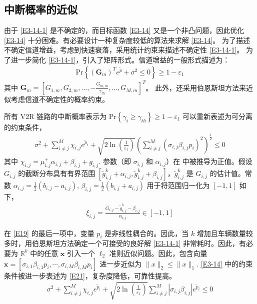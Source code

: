 \subsection{中断概率的近似}\label{section3-3-2}

由于 \eqref{E3-14-1} 是不确定的，而目标函数 \eqref{E3-14} 又是一个非凸问题，因此优化 \eqref{E3-14} 十分困难。有必要设计一种复杂度较低的算法来求解 \eqref{E3-14}。 为了描述不确定信道增益，考虑到快速衰落，采用统计约束来描述不确定性 \eqref{E3-14-1}。 为了进一步简化 \eqref{E3-14-1}，引入了矩阵形式。信道增益的一般形式描述为：
\begin{eqnarray}\label{E18}
\textrm{Pr}\left\{\left(\textbf{G}_m\right)^Te^{\widetilde{p}}+\sigma^2\le0\right\}\geq1-\varepsilon_1
\end{eqnarray}
其中 $\textbf{G}_m=\left[G_{1,m},G_{2,m},\ldots,-\frac{G_{m,m}}{\gamma_{th}},\ldots,G_{M,m}\right]^T$。
此外，还采用伯恩斯坦方法来近似考虑信道不确定性的概率约束。

所有 V2R 链路的中断概率表示为 $\textrm{Pr}\left\{\gamma_i\geq\gamma_{th}\right\}\geq1-\varepsilon_1$
可以重新表述为可分离的约束条件，
\begin{eqnarray}\label{E19}
\!\!\!\sigma^2+\!\sum_{i\neq j}^{M}{\chi_{i,j}e^{{\widetilde{p}}_i}}+\sqrt{2\ln\left(\frac{1}{\varepsilon_1}\right)}\left(\sum_{i\neq j}^{M}\left(\sigma_{i,j}\beta_{i,j}p_i\right)^2\right)^\frac{1}{2}\!\!\!\!\!\le0
\end{eqnarray}
其中 $\chi_{i,j}=\mu_{i,j}^+\alpha_{i,j}+\beta_{i,j}+g_{i,j}$. 参数（即 $\sigma_{i,j}$ 和 $\alpha_{i,j}$）在 \cite{CCO} 中被推导为正值。假设 $G_{i,j}$ 的截断分布具有有界范围 $\left[{\widetilde{g}}_{i,j}^k+\alpha_{i,j},{\widetilde{g}}_{i,j}^k+\beta_{i,j}\right]$，${\widetilde{g}}_{i,j}^k$ 是 $G_{i,j}$ 的估计值。常数 $\alpha_{i,j}=\frac{1}{2}\left(b_{i,j}-a_{i,j}\right)$, $\beta_{i,j}=\frac{1}{2}\left(b_{i,j}+a_{i,j}\right)$ 用于将范围归一化为 $\left[-1,1\right]$ 如下，
\begin{eqnarray}\label{E20}
\xi_{i,j}=\frac{G_{i,j}-{\widetilde{g}}_{i,j}^k-\beta_{i,j}}{\alpha_{i,j}}\in\left[-1,1\right]
\end{eqnarray}

在 \eqref{E19} 的最后一项中，变量 $p_i$ 是非线性耦合的。因此，当 $k$ 增加且车辆数量较多时，用伯恩斯坦方法确定一个可接受的良好解 \eqref{E3-14-1} 非常耗时。因此，有必要为 $\mathbb{R}^k$ 中的任意 $\mathbf{x}$ 引入一个 $\ell_2$ 准则近似问题。因此，包含向量 $\mathbf{x}=\left[\sigma_{i,1}\beta_{i,1}p_i,\cdots,\sigma_{i,M}\beta_{i,M}p_i\right]$ 进一步近似为 $\parallel x\parallel_2 \le \parallel x\parallel_1$. \eqref{E3-14} 中的约束条件被进一步表述为 \eqref{E21}，复杂度降低，可靠性提高。
\begin{eqnarray}\label{E21}
\sigma^2+\sum_{i\neq j}^{M}{\chi_{i,j}e^{{\widetilde{p}}_i}}+\sqrt{2\ln\left(\frac{1}{\varepsilon_1}\right)}\sum_{i\neq j}^{M}{\left|\sigma_{i,j}\beta_{i,j}\right|e^{{\widetilde{p}}_i}}\le0
\end{eqnarray}

